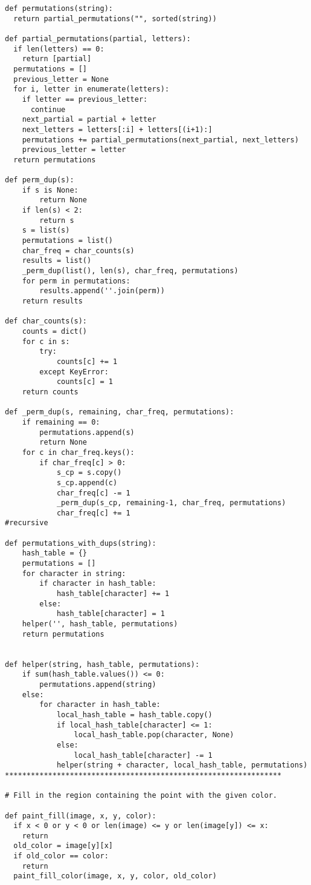 \documentclass[12pt]{article}
\begin{document}
\begin{lstlisting}
def permutations(string):
  return partial_permutations("", sorted(string))

def partial_permutations(partial, letters):
  if len(letters) == 0:
    return [partial]
  permutations = []
  previous_letter = None
  for i, letter in enumerate(letters):
    if letter == previous_letter:
      continue
    next_partial = partial + letter
    next_letters = letters[:i] + letters[(i+1):]
    permutations += partial_permutations(next_partial, next_letters)
    previous_letter = letter
  return permutations

def perm_dup(s):
    if s is None:
        return None
    if len(s) < 2:
        return s
    s = list(s)
    permutations = list()
    char_freq = char_counts(s)
    results = list()
    _perm_dup(list(), len(s), char_freq, permutations)
    for perm in permutations:
        results.append(''.join(perm))
    return results

def char_counts(s):
    counts = dict()
    for c in s:
        try:
            counts[c] += 1
        except KeyError:
            counts[c] = 1
    return counts

def _perm_dup(s, remaining, char_freq, permutations):
    if remaining == 0:
        permutations.append(s)
        return None
    for c in char_freq.keys():
        if char_freq[c] > 0:
            s_cp = s.copy()
            s_cp.append(c)
            char_freq[c] -= 1
            _perm_dup(s_cp, remaining-1, char_freq, permutations)
            char_freq[c] += 1
#recursive

def permutations_with_dups(string):
    hash_table = {}
    permutations = []
    for character in string:
        if character in hash_table:
            hash_table[character] += 1
        else:
            hash_table[character] = 1
    helper('', hash_table, permutations)
    return permutations


def helper(string, hash_table, permutations):
    if sum(hash_table.values()) <= 0:
        permutations.append(string)
    else:
        for character in hash_table:
            local_hash_table = hash_table.copy()
            if local_hash_table[character] <= 1:
                local_hash_table.pop(character, None)
            else:
                local_hash_table[character] -= 1
            helper(string + character, local_hash_table, permutations)
****************************************************************

# Fill in the region containing the point with the given color.

def paint_fill(image, x, y, color):
  if x < 0 or y < 0 or len(image) <= y or len(image[y]) <= x:
    return
  old_color = image[y][x]
  if old_color == color:
    return
  paint_fill_color(image, x, y, color, old_color)


\end{lstlisting}
\end{document}
